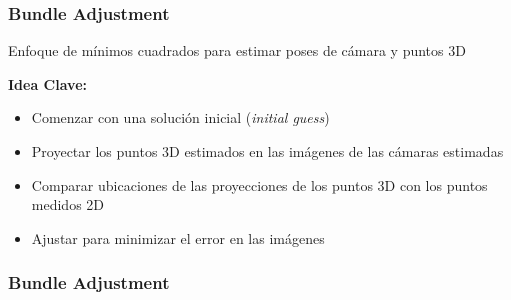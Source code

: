 \begin{frame}
    \frametitle{Bundle Adjustment}
    
    Enfoque de mínimos cuadrados para estimar poses de cámara y puntos 3D
    
    \textbf{Idea Clave:}
    \begin{itemize}
        \item Comenzar con una solución inicial (\emph{initial guess})
        \item Proyectar los puntos 3D estimados en las imágenes de las cámaras estimadas
        \item Comparar ubicaciones de las proyecciones de los puntos 3D con los puntos medidos 2D
        \item Ajustar para minimizar el error en las imágenes
    \end{itemize}
    
\end{frame}

\begin{frame}
    \frametitle{Bundle Adjustment}
    
    
\end{frame}


